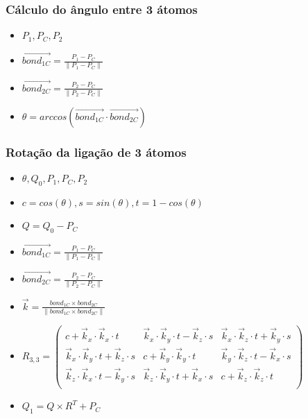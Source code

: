 \documentclass{beamer}
\begin{document}
\begin{frame}
\frametitle{Cálculo do ângulo entre 3 átomos}
\begin{itemize}
 \item $P_{1}, P_{C}, P_{2}$
 \item $\vec{bond_{1C}} = \frac{P_{1} - P_{C}}{\parallel P_{1} - P_{C} \parallel}$
 \item $\vec{bond_{2C}} = \frac{P_{2} - P_{C}}{\parallel P_{2} - P_{C} \parallel}$
 \item $\theta = arccos(\vec{bond_{1C}} \cdot \vec{bond_{2C}})$
\end{itemize}
\end{frame}

\begin{frame}
\frametitle{Rotação da ligação de 3 átomos}

\begin{itemize}
 \item $\theta, Q_{0}, P_{1}, P_{C}, P_{2}$
 \item $c = cos(\theta), s = sin(\theta), t = 1 - cos(\theta)$
 \item $Q = Q_{0} - P_{C}$
 \item $\vec{bond_{1C}} = \frac{P_{1} - P_{C}}{\parallel P_{1} - P_{C} \parallel}$
 \item $\vec{bond_{2C}} = \frac{P_{2} - P_{C}}{\parallel P_{2} - P_{C} \parallel}$
 \item $\vec{k} = \frac{bond_{1C} \times bond_{2C}}{\parallel bond_{1C} \times bond_{2C} \parallel}$
 
 \item $R_{3,3} = 
	\begin{pmatrix}
	  c + \vec{k}_{x} \cdot \vec{k}_{x} \cdot t & \vec{k}_{x} \cdot \vec{k}_{y} \cdot t - \vec{k}_{z} \cdot s & \vec{k}_{x} \cdot \vec{k}_{z} \cdot t + \vec{k}_{y} \cdot s \\[0.01em]
	  \vec{k}_{x} \cdot \vec{k}_{y} \cdot t + \vec{k}_{z} \cdot s  & c + \vec{k}_{y} \cdot \vec{k}_{y} \cdot t & \vec{k}_{y} \cdot \vec{k}_{z} \cdot t - \vec{k}_{x} \cdot s \\[0.01em]
	  \vec{k}_{z} \cdot \vec{k}_{x} \cdot t - \vec{k}_{y} \cdot s  & \vec{k}_{z} \cdot \vec{k}_{y} \cdot t + \vec{k}_{x} \cdot s & c + \vec{k}_{z} \cdot \vec{k}_{z} \cdot t \\[0.01em]
	\end{pmatrix}$
 
 \item $Q_{1} = Q \times R^{T} + P_{C}$
\end{itemize}
\end{frame}
\end{document}
